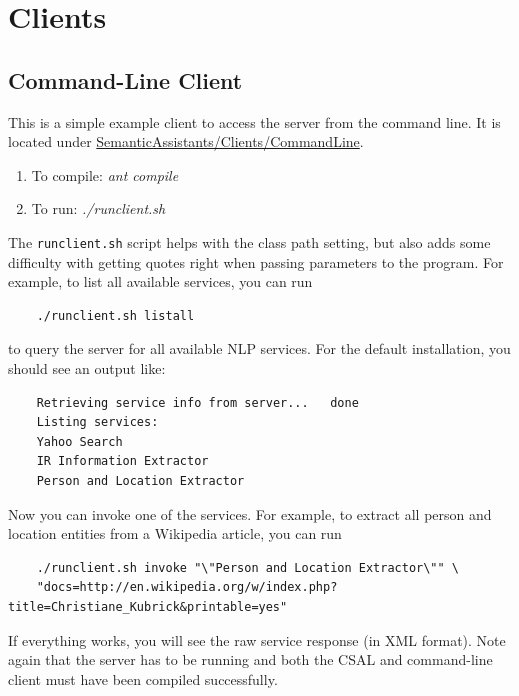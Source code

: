 

   
 

\chapter{\sa Clients}\label{chap:clients}

\section{Command-Line Client}
\label{sec:sacl:clc}
This is a simple example client to access the server from the command line.
It is located under \url{SemanticAssistants/Clients/CommandLine}. 
\begin{enumerate}
\item To compile: \emph{ant compile}
\item To run: \emph{./runclient.sh}
\end{enumerate}

The \texttt{runclient.sh} script helps with the
class path setting, but also adds some difficulty with getting quotes right
when passing parameters to the program. For example, to list all
available services, you can run
\begin{verbatim}
    ./runclient.sh listall
\end{verbatim}
to query the server for all available NLP services. For the default
installation, you should see an output like:
\begin{verbatim}
    Retrieving service info from server...   done
    Listing services:
    Yahoo Search
    IR Information Extractor
    Person and Location Extractor
\end{verbatim}
Now you can invoke one of the services. For example, to extract all
person and location entities from a Wikipedia article, you can run
\begin{verbatim}
    ./runclient.sh invoke "\"Person and Location Extractor\"" \
    "docs=http://en.wikipedia.org/w/index.php?title=Christiane_Kubrick&printable=yes"
\end{verbatim}
If everything works, you will see the raw service response (in XML
format).  Note again that the server has to be running and both the
CSAL and command-line client must have been compiled successfully.

